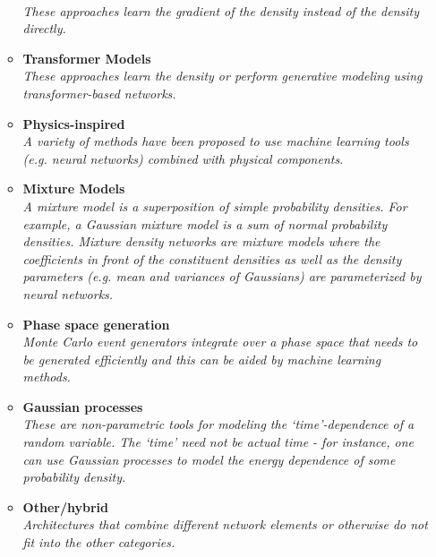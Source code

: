 \documentclass[12pt,letterpaper]{article}
\begin{document}
\begin{itemize}
\begin{itemize}
		\\\textit{These approaches learn the gradient of the density instead of the density directly.}
		\item \textbf{Transformer Models}~\cite{Finke:2023veq,Butter:2023fov,Raine:2023fko}
		\\\textit{These approaches learn the density or perform generative modeling using transformer-based networks.}
		\item \textbf{Physics-inspired}~\cite{Andreassen:2018apy,Andreassen:2019txo,1808876,Lai:2020byl,Barenboim:2021vzh}
		\\\textit{A variety of methods have been proposed to use machine learning tools (e.g. neural networks) combined with physical components.}
		\item \textbf{Mixture Models}~\cite{Chen:2020uds,Burton:2021tsd,Graziani:2021vai,Liu:2022dem}
		\\\textit{A mixture model is a superposition of simple probability densities.  For example, a Gaussian mixture model is a sum of normal probability densities.  Mixture density networks are mixture models where the coefficients in front of the constituent densities as well as the density parameters (e.g. mean and variances of Gaussians) are parameterized by neural networks.}
		\item \textbf{Phase space generation}~\cite{Bendavid:2017zhk,Bothmann:2020ywa,Gao:2020zvv,Gao:2020vdv,Klimek:2018mza,Carrazza:2020rdn,Nachman:2020fff,Chen:2020nfb,Verheyen:2020bjw,Backes:2020vka,Danziger:2021eeg,Yoon:2020zmb,Maitre:2022xle,Jinno:2022sbr,Heimel:2022wyj,Renteria-Estrada:2023buo,Singh:2023yvj}
		\\\textit{Monte Carlo event generators integrate over a phase space that needs to be generated efficiently and this can be aided by machine learning methods.}
		\item \textbf{Gaussian processes}~\cite{Frate:2017mai,Bertone:2016mdy,1804325,Cisbani:2019xta}
		\\\textit{These are non-parametric tools for modeling the `time'-dependence of a random variable.  The `time' need not be actual time - for instance, one can use Gaussian processes to model the energy dependence of some probability density.}
		\item \textbf{Other/hybrid}~\cite{Cresswell:2022tof,DiBello:2022rss,Li:2022jon,Kansal:2022spb,Butter:2023fov,Kronheim:2023jrl}
		\\\textit{Architectures that combine different network elements or otherwise do not fit into the other categories.}

\end{itemize}
\end{itemize}
\end{document}
